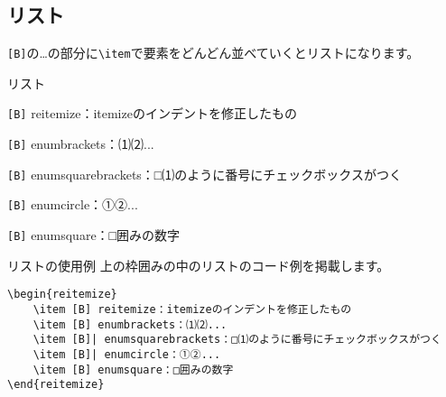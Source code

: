 \begin{multicols*}{2}
\section{リスト}
\verb|[B]|の\dots の部分に\verb|\item|で要素をどんどん並べていくとリストになります。
\begin{framebox-simple}{リスト}
    \begin{reitemize}
        \item \verb|[B]| reitemize：itemizeのインデントを修正したもの
        \item \verb|[B]| enumbrackets：⑴⑵...
        \item \verb|[B]| enumsquarebrackets：□⑴のように番号にチェックボックスがつく
        \item \verb|[B]| enumcircle：①②...
        \item \verb|[B]| enumsquare：□囲みの数字
    \end{reitemize}
\end{framebox-simple}
\begin{framebox-ref}{リストの使用例}
上の枠囲みの中のリストのコード例を掲載します。
\begin{verbatim}
\begin{reitemize}
    \item [B] reitemize：itemizeのインデントを修正したもの
    \item [B] enumbrackets：⑴⑵...
    \item [B]| enumsquarebrackets：□⑴のように番号にチェックボックスがつく
    \item [B]| enumcircle：①②...
    \item [B] enumsquare：□囲みの数字
\end{reitemize}
\end{verbatim}
\end{framebox-ref}


\end{multicols*}
